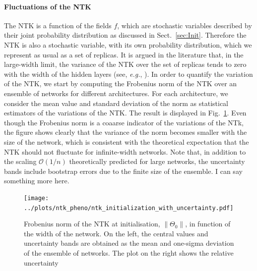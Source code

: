\paragraph{Fluctuations of the NTK}
The NTK is a function of the fields $f$, which are stochastic variables
described by their joint probability distribution as discussed in
Sect.~\ref{sec:Init}. Therefore the NTK is also a stochastic variable, with its
own probability distribution, which we represent as usual as a set of replicas.
It is argued in the literature that, in the large-width limit, the variance of
the NTK over the set of replicas tends to zero with the width of the hidden
layers (see, \textit{e.g.}, \cite{Roberts:2021fes}). In order to quantify the
variation of the NTK, we start by computing the Frobenius norm of the NTK over
an ensemble of networks for different architectures. For each architecture, we
consider the mean value and standard deviation of the norm as statistical
estimators of the variations of the NTK. The result is displayed in
Fig.~\ref{fig:NTKInit}. Even though the Frobenius norm is a coaarse indicator of
the variations of the NTk, the figure shows clearly that the variance of the
norm becomes smaller with the size of the network, which is consistent with the
theoretical expectation that the NTK should not fluctuate for infinite-width
networks. Note that, in addition to the scaling $\mathcal{O}(1/n)$ theoretically
predicted for large networks, the uncertainty bands include bootstrap errors due
to the finite size of the ensemble. \ac{I can say something more here.}

\begin{figure}[ht!]
  \centering
  \texttt{[image: ../plots/ntk\_pheno/ntk\_initialization\_with\_uncertainty.pdf]}
  \caption{Frobenius norm of the NTK at initialisation, $\lVert \Theta_0
  \rVert$, in function of the width of the network. On the left, the central
  values and uncertainty bands are obtained as the mean and one-sigma deviation
  of the ensemble of networks. The plot on the right shows the relative
  uncertainty }
  \label{fig:NTKInit}
\end{figure}

\FloatBarrier

